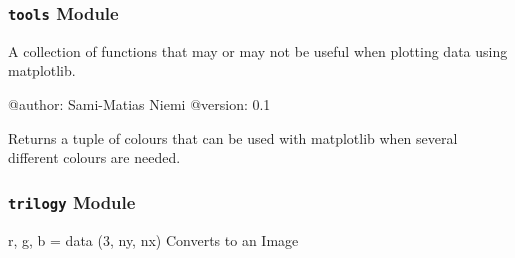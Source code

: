 \documentclass[letterpaper,10pt,english]{sphinxmanual}
\begin{document}
\subsubsection{\texttt{tools} Module}
\label{SamPy.plot:module-SamPy.plot.tools}\label{SamPy.plot:tools-module}
A collection of functions that may or may not be useful
when plotting data using matplotlib.

@author: Sami-Matias Niemi
@version: 0.1


\begin{fulllineitems}
\label{SamPy.plot:SamPy.plot.tools.give_colours}
Returns a tuple of colours that can be used
with matplotlib when several different colours
are needed.

\end{fulllineitems}



\subsubsection{\texttt{trilogy} Module}
\label{SamPy.plot:module-SamPy.plot.trilogy}\label{SamPy.plot:trilogy-module}

\begin{fulllineitems}
\label{SamPy.plot:SamPy.plot.trilogy.RGB2im}
r, g, b = data  (3, ny, nx)
Converts to an Image

\end{fulllineitems}



\begin{fulllineitems}
\label{SamPy.plot:SamPy.plot.trilogy.RGBscale2im}
\end{fulllineitems}


\end{document}
